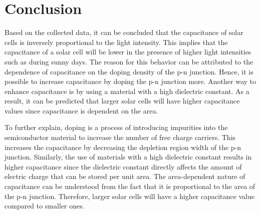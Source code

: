 \section{Conclusion}
	Based on the collected data, it can be concluded that the capacitance of solar cells is inversely proportional to the light intensity. This implies that the capacitance of a solar cell will be lower in the presence of higher light intensities such as during sunny days. The reason for this behavior can be attributed to the dependence of capacitance on the doping density of the p-n junction. Hence, it is possible to increase capacitance by doping the p-n junction more. Another way to enhance capacitance is by using a material with a high dielectric constant. As a result, it can be predicted that larger solar cells will have higher capacitance values since capacitance is dependent on the area.

	To further explain, doping is a process of introducing impurities into the semiconductor material to increase the number of free charge carriers. This increases the capacitance by decreasing the depletion region width of the p-n junction. Similarly, the use of materials with a high dielectric constant results in higher capacitance since the dielectric constant directly affects the amount of electric charge that can be stored per unit area. The area-dependent nature of capacitance can be understood from the fact that it is proportional to the area of the p-n junction. Therefore, larger solar cells will have a higher capacitance value compared to smaller ones.